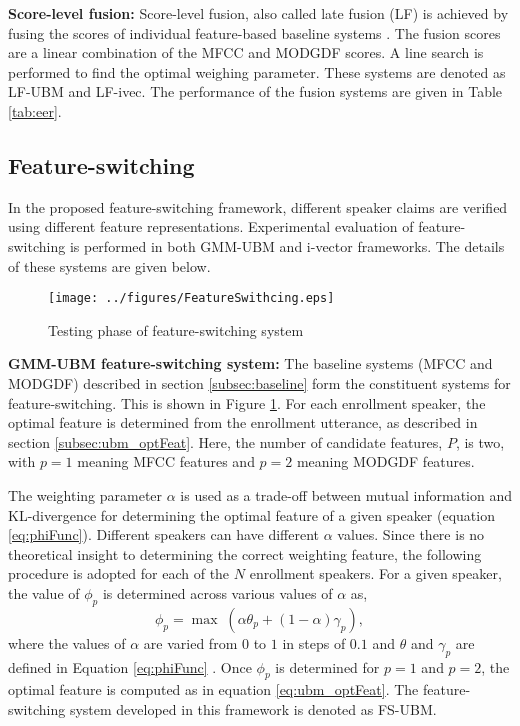 \documentclass[preprint,12pt,5p]{elsarticle}
\begin{document}
\textbf{Score-level fusion:}  Score-level fusion, also called late fusion (LF)
is achieved by fusing the scores of individual feature-based baseline systems
\cite{fusion}. The fusion scores are a linear combination of the MFCC and MODGDF
scores. A line search is performed to find the optimal weighing parameter. These
systems are denoted as LF-UBM and LF-ivec.  The performance of the fusion
systems are given in Table \ref{tab:eer}. 

	
\subsection{Feature-switching}
\label{subsec:featSwitch}

In the proposed feature-switching framework, different speaker
claims are verified using different feature representations. 
Experimental evaluation of feature-switching is performed in both
GMM-UBM and i-vector frameworks. The details of these systems
are given below.

\begin{figure}[h]
\texttt{[image: ../figures/FeatureSwithcing.eps]}
\caption{Testing phase of feature-switching system}
\label{fig:systemArch2}
\end{figure}


\textbf{GMM-UBM feature-switching system:}
The baseline systems (MFCC and MODGDF) described in section
\ref{subsec:baseline} form the constituent systems for feature-switching. This
is shown in Figure \ref{fig:systemArch2}. For each enrollment speaker, the
optimal feature is determined from the enrollment utterance, as described in
section \ref{subsec:ubm_optFeat}. Here, the number of candidate features, $P$,
is two, with $p=1$ meaning MFCC features and $p=2$ meaning MODGDF features.

The weighting parameter $\alpha$ is used as a trade-off between mutual information and
KL-divergence for determining the optimal feature of a given speaker (equation
\ref{eq:phiFunc}). Different speakers can have different $\alpha$ values. Since
there is no theoretical insight to determining the correct weighting feature,
the following procedure is adopted for each of the $N$ enrollment speakers.
For a given speaker, the value of $\phi_p$ is determined across various values
of $\alpha$ as, 
\begin{equation}
\phi_p = \max \; (\alpha \theta_p + (1-\alpha) \gamma_p),
\end{equation}
where the values of $\alpha$ are varied from $0$ to $1$ in steps of $0.1$ and $\theta$ and 
$\gamma_p$ are defined in Equation \ref{eq:phiFunc} . Once
$\phi_p$ is determined for $p=1$ and $p=2$, the optimal feature is computed as in equation
\ref{eq:ubm_optFeat}.
The feature-switching system developed in this framework is denoted as
FS-UBM. 
\end{document}
